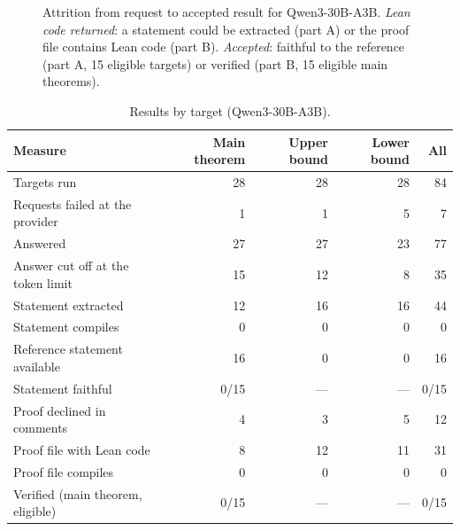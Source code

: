\documentclass[11pt]{article}
\begin{document}
\begin{figure}[!htbp]
\centering
{}
\caption{Attrition from request to accepted result for Qwen3-30B-A3B. \emph{Lean code returned}: a statement could be extracted (part A) or the proof file contains Lean code (part B). \emph{Accepted}: faithful to the reference (part A, 15 eligible targets) or verified (part B, 15 eligible main theorems).}
\label{fig:f-attrition}
\end{figure}

\begin{table}[!htbp]
\centering
\caption{Results by target (Qwen3-30B-A3B).}
\label{tab:f-targets}
\small
\begin{tabular}{@{}lrrrr@{}}
\toprule
Measure & Main theorem & Upper bound & Lower bound & All \\
\midrule
Targets run & 28 & 28 & 28 & 84 \\
Requests failed at the provider & 1 & 1 & 5 & 7 \\
Answered & 27 & 27 & 23 & 77 \\
Answer cut off at the token limit & 15 & 12 & 8 & 35 \\
Statement extracted & 12 & 16 & 16 & 44 \\
Statement compiles & 0 & 0 & 0 & 0 \\
Reference statement available & 16 & 0 & 0 & 16 \\
Statement faithful & 0/15 & --- & --- & 0/15 \\
Proof declined in comments & 4 & 3 & 5 & 12 \\
Proof file with Lean code & 8 & 12 & 11 & 31 \\
Proof file compiles & 0 & 0 & 0 & 0 \\
Verified (main theorem, eligible) & 0/15 & --- & --- & 0/15 \\
\bottomrule
\end{tabular}
\end{table}
\end{document}
